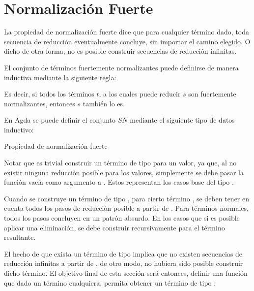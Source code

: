\section{Normalización Fuerte}

La propiedad de normalización fuerte dice que para cualquier término dado, toda secuencia de reducción eventualmente concluye, sin importar el camino elegido.
O dicho de otra forma, no es posible construir secuencias de reducción infinitas.

El conjunto de términos fuertemente normalizantes puede definirse de manera inductiva mediante la siguiente regla:

\begin{center}
	\begin{prooftree}
	\end{prooftree}
\end{center}

Es decir, si todos los términos $t$, a los cuales puede reducir $s$ son fuertemente normalizantes, entonces $s$ también lo es. 

En Agda se puede definir el conjunto $SN$ mediante el siguiente tipo de datos inductivo: 

\begin{codigo}
	Propiedad de normalización fuerte
\end{codigo}

Notar que es trivial construir un término de tipo  para un valor, ya que, al no existir ninguna reducción posible para los valores, simplemente se debe pasar la función vacía como argumento a .
Estos representan los casos base del tipo .

\begin{example}
	Cuando se construye un término de tipo  , para cierto término , se deben tener en cuenta todos los pasos de reducción posible a partir de .
	Para términos normales, todos los pasos concluyen en un patrón absurdo.
	En los casos que si es posible aplicar una eliminación, se debe construir recursivamente  para el término resultante.
	
\end{example}

El hecho de que exista un término de tipo   implica que no existen secuencias de reducción infinitas a partir de , de otro modo, no hubiera sido posible construir dicho término.
El objetivo final de esta sección será entonces, definir una función que dado un término cualquiera, permita obtener un término de tipo  :

